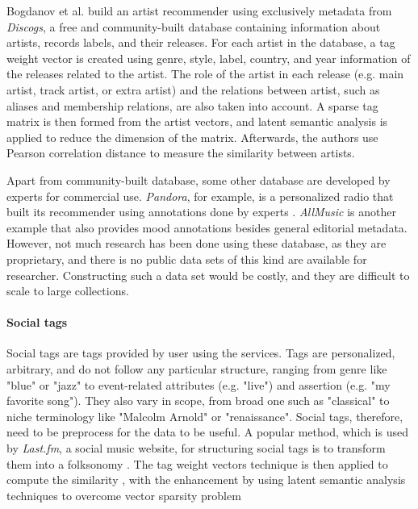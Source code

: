 Bogdanov et al. \cite{bogdanov2012taking} build an artist recommender using exclusively metadata from \textit{Discogs}, a free and community-built database containing information about artists, records labels, and their releases. For each artist in the database, a tag weight vector is created using genre, style, label, country, and year information of the releases related to the artist. The role of the artist in each release (e.g. main artist, track artist, or extra artist) and the relations between artist, such as aliases and membership relations, are also taken into account. A sparse tag matrix is then formed from the artist vectors, and latent semantic analysis \cite{deerwester1990indexing} is applied to reduce the dimension of the matrix. Afterwards, the authors use Pearson correlation distance \cite{gibbons2011nonparametric} to measure the similarity between artists.

Apart from community-built database, some other database are developed by experts for commercial use. \textit{Pandora}, for example, is a personalized radio that built its recommender using annotations done by experts \cite{jones2007user}. \textit{AllMusic} is another example that also provides mood annotations besides general editorial metadata. However, not much research has been done using these database, as they are proprietary, and there is no public data sets of this kind are available for researcher. Constructing such a data set would be costly, and they are difficult to scale to large collections.

\paragraph{Social tags}
Social tags are tags provided by user using the services. Tags are personalized, arbitrary, and do not follow any particular structure, ranging from genre like "blue" or "jazz" to event-related attributes (e.g. "live") and assertion (e.g. "my favorite song"). They also vary in scope, from broad one such as "classical" to niche terminology like "Malcolm Arnold" or "renaissance". Social tags, therefore, need to be preprocess for the data to be useful. A popular method, which is used by \textit{Last.fm}, a social music website, for structuring social tags is to transform them into a folksonomy \cite{sordo2008quest}. The tag weight vectors technique is then applied to compute the similarity \cite{green2009generating}, with the enhancement by using latent semantic analysis techniques to overcome vector sparsity problem \cite{levy2008learning}

